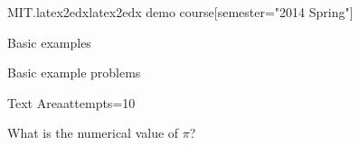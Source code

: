 \documentclass[12pt]{article}
\begin{document}
\begin{edXcourse}{MIT.latex2edx}{latex2edx demo course}[semester="2014 Spring"]

\begin{edXchapter}{Basic examples}

\begin{edXsection}{Basic example problems}

\begin{edXvertical}

\begin{edXproblem}{Text Area}{attempts=10}

What is the numerical value of $\pi$?


\end{edXproblem}
\end{edXvertical}
\end{edXsection}
\end{edXchapter}
\end{edXcourse}
\end{document}
